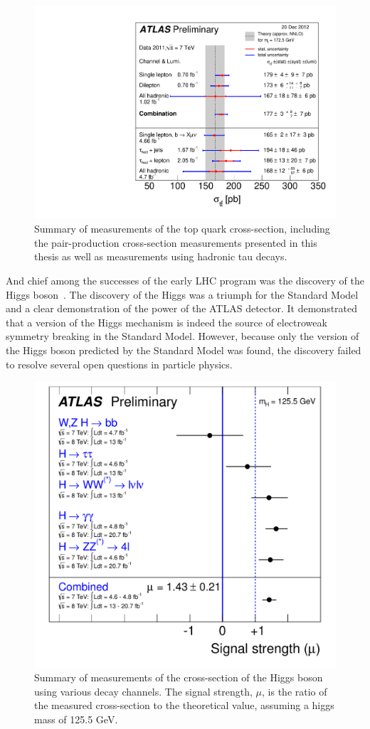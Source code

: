 \begin{figure}[ht!]
  \begin{center}
    \includegraphics[width=.75\textwidth]{figures/conclusion/tt_xsec20Dec2012}
    \caption{Summary of measurements of the top quark cross-section, including the pair-production cross-section measurements presented in this thesis as well as measurements using hadronic tau decays.}
    \label{fig:xsec_vs_roots}
  \end{center}
\end{figure}
\clearpage

And chief among the successes of the early LHC program was the discovery of the Higgs boson~\cite{HiggsObservation:2012}.
The discovery of the Higgs was a triumph for the Standard Model and a clear demonstration of the power of the ATLAS detector.
It demonstrated that a version of the Higgs mechanism is indeed the source of electroweak symmetry breaking in the Standard Model.
However, because only the version of the Higgs boson predicted by the Standard Model was found, the discovery failed to resolve
several open questions in particle physics.

\begin{figure}[ht!]
  \begin{center}
    \includegraphics[width=.75\textwidth]{figures/conclusion/HiggsCrossSection}
    \caption{Summary of measurements of the cross-section of the Higgs boson using various decay channels.
      The signal strength, $\mu$, is the ratio of the measured cross-section to the theoretical value, assuming a higgs mass of 125.5 GeV.}
    \label{fig:higgs_cross_section}
  \end{center}
\end{figure}
\clearpage

